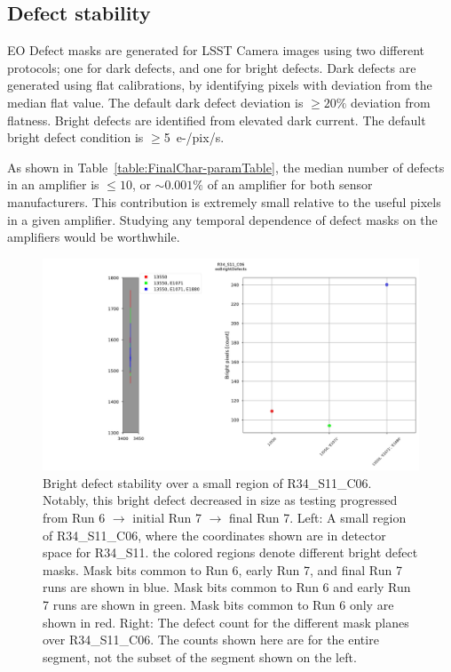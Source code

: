 \subsection{Defect stability}\label{defect-stability}

EO Defect masks are generated for LSST Camera images using two different protocols; one for dark defects, and one for bright defects. Dark defects are generated using flat calibrations, by identifying pixels with deviation from the median flat value. The default dark defect deviation is $\geq 20\%$ deviation from flatness. Bright defects are identified from elevated dark current. The default bright defect condition is $\geq$5 \,e-/pix/s.

As shown in Table~\ref{table:FinalChar-paramTable}, the median number of defects in an amplifier is $\leq 10$, or $\sim0.001 \%$ of an amplifier for both sensor manufacturers. This contribution is extremely small relative to the useful pixels in a given amplifier. Studying any temporal dependence of defect masks on the amplifiers would be worthwhile.  %

\begin{figure}[ht]
    \centering
    \includegraphics[width=\linewidth]{figures/R34_S11_C06(1).jpg}
    \caption{Bright defect stability over a small region of R34\_S11\_C06. Notably, this bright defect decreased in size as testing progressed from Run 6 $\rightarrow$ initial Run 7 $\rightarrow$ final Run 7. Left: A small region of R34\_S11\_C06, where the coordinates shown are in detector space for R34\_S11. the colored regions denote different bright defect masks. Mask bits common to Run 6, early Run 7, and final Run 7 runs are shown in blue. Mask bits common to Run 6 and early Run 7 runs are shown in green. Mask bits common to Run 6 only are shown in red. Right: The defect count for the different mask planes over R34\_S11\_C06. The counts shown here are for the entire segment, not the subset of the segment shown on the left.}
    \label{fig:BrightDefectStability}
\end{figure}

